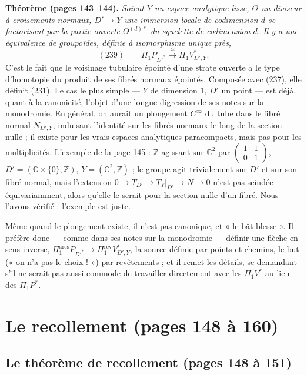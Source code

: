\documentclass[11pt,a4paper]{article}
\begin{document}
\textbf{Théorème (pages 143--144).} \emph{Soient $Y$ un espace analytique lisse,
$\Theta$ un diviseur à croisements normaux, $D' \to Y$ une immersion locale de
codimension $d$ se factorisant par la partie ouverte $\Theta^{(d)*}$ du squelette
de codimension $d$. Il y a une équivalence de groupoïdes, définie à isomorphisme
unique près,}
\[
(239) \qquad \Pi_1 P_{D'^{*}} \xrightarrow{\ \approx\ } \Pi_1 V^{*}_{D',Y} .
\]
C'est le fait que le voisinage tubulaire épointé d'une strate ouverte a le type
d'homotopie du produit de ses fibrés normaux épointés. Composée avec (237), elle
définit (231). Le cas le plus simple — $Y$ de dimension $1$, $D'$ un point — est
déjà, quant à la canonicité, l'objet d'une longue digression de ses notes sur la
monodromie. En général, on aurait un plongement $C^\infty$ du tube dans le fibré
normal $\check{N}_{D',Y}$, induisant l'identité sur les fibrés normaux le long de
la section nulle ; il existe pour les vrais espaces analytiques paracompacts, mais
pas pour les multiplicités. L'exemple de la page 145 : $\mathbb{Z}$ agissant sur
$\mathbb{C}^2$ par $\begin{pmatrix} 1 & 1 \\ 0 & 1 \end{pmatrix}$, $D' = (\mathbb{C}
\times \{0\}, \mathbb{Z})$, $Y = (\mathbb{C}^2, \mathbb{Z})$ ; le groupe agit
trivialement sur $D'$ et sur son fibré normal, mais l'extension $0 \to T_{D'} \to
T_Y|_{D'} \to N \to 0$ n'est pas scindée équivariamment, alors qu'elle le serait
pour la section nulle d'un fibré. Nous l'avons vérifié : l'exemple est juste.

Même quand le plongement existe, il n'est pas canonique, et « le bât blesse ». Il
préfère donc — comme dans ses notes sur la monodromie — définir une flèche en sens
inverse, $\Pi_1^{\text{arcs}} P_{D'^{*}} \to \Pi_1^{\text{rev}} V^{*}_{D',Y}$,
la source définie par points et chemins, le but (« on n'a pas le choix ! ») par
revêtements ; et il remet les détails, se demandant s'il ne serait pas aussi
commode de travailler directement avec les $\Pi_1 V^{*}$ au lieu des $\Pi_1 P^{*}$.

\section*{Le recollement (pages 148 à 160)}

\subsection*{Le théorème de recollement (pages 148 à 151)}
\end{document}
